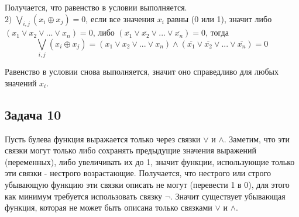 \documentclass[a4paper,12pt]{article} %
\begin{document}
Получается, что равенство в условии выполняется.\\
$2)$ $\bigvee \limits_{i, j} (x_i\oplus x_j)=0$, если все значения $x_i$ равны (0 или 1), значит либо $(x_1\vee x_2 \vee ... \vee x_n)=0$, либо $(\overline{x_1} \vee \overline{x_2} \vee ... \vee \overline{x_n})= 0$, тогда
\[\bigvee \limits_{i, j} (x_i\oplus x_j)=(x_1\vee x_2 \vee ... \vee x_n)\wedge (\overline{x_1} \vee \overline{x_2} \vee ... \vee \overline{x_n})=0 \]

Равенство в условии снова выполняется, значит оно справедливо для любых значений $x_i$.

\newpage
\begin{center}
\section*{Задача 10}
\end{center}
\par
Пусть булева функция выражается только через связки $\vee$ и $\wedge$. Заметим, что эти связки могут только либо сохранять предыдущие значения выражений (переменных), либо увеличивать их до 1, значит функции, использующие только эти связки - нестрого возрастающие. Получается, что нестрого или строго убывающую функцию эти связки описать не могут (перевести 1 в 0), для этого как минимум требуется использовать связку $\neg$.
Значит существует убывающая функция, которая не может быть описана только связками $\vee$ и $\wedge$.
\end{document}
